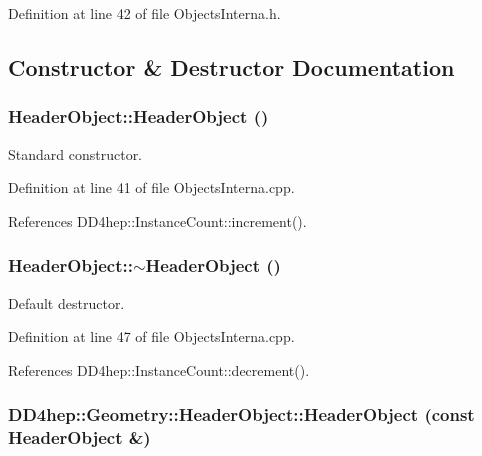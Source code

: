 Definition at line 42 of file ObjectsInterna.h.

\subsection{Constructor \& Destructor Documentation}
\hypertarget{class_d_d4hep_1_1_geometry_1_1_header_object_a5eed0824bd2e8fc9bdc3a83741bea1d0}{
\subsubsection[{HeaderObject}]{\setlength{\rightskip}{0pt plus 5cm}HeaderObject::HeaderObject ()}}
\label{class_d_d4hep_1_1_geometry_1_1_header_object_a5eed0824bd2e8fc9bdc3a83741bea1d0}


Standard constructor. 

Definition at line 41 of file ObjectsInterna.cpp.

References DD4hep::InstanceCount::increment().\hypertarget{class_d_d4hep_1_1_geometry_1_1_header_object_a85f2f362b11a0ebb206e118489a3810f}{
\subsubsection[{$\sim$HeaderObject}]{\setlength{\rightskip}{0pt plus 5cm}HeaderObject::$\sim$HeaderObject ()}}
\label{class_d_d4hep_1_1_geometry_1_1_header_object_a85f2f362b11a0ebb206e118489a3810f}


Default destructor. 

Definition at line 47 of file ObjectsInterna.cpp.

References DD4hep::InstanceCount::decrement().\hypertarget{class_d_d4hep_1_1_geometry_1_1_header_object_a335972108c4e573ae75d9f174b8acc19}{
\subsubsection[{HeaderObject}]{\setlength{\rightskip}{0pt plus 5cm}DD4hep::Geometry::HeaderObject::HeaderObject (const {\bf HeaderObject} \&)}}
\label{class_d_d4hep_1_1_geometry_1_1_header_object_a335972108c4e573ae75d9f174b8acc19}


